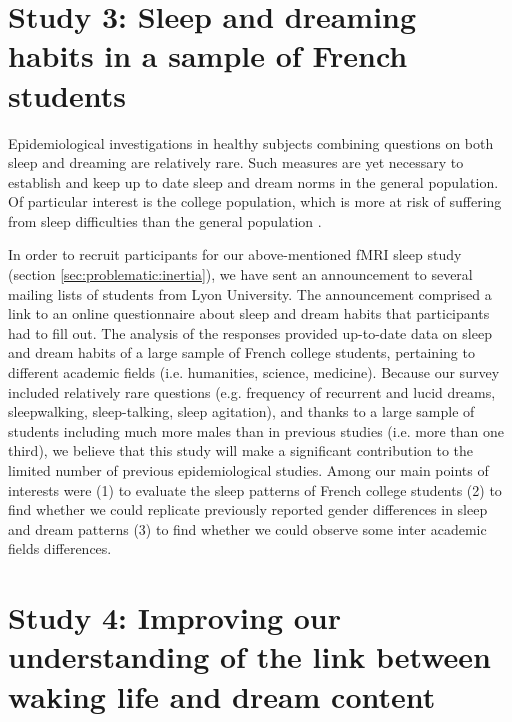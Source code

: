 \FloatBarrier

\section{Study 3: Sleep and dreaming habits in a sample of French students}
\label{sec:problematic:survey}

Epidemiological investigations in healthy subjects combining questions on both sleep and dreaming are relatively rare. Such measures are yet necessary to establish and keep up to date sleep and dream norms in the general population. Of particular interest is the college population, which is more at risk of suffering from sleep difficulties than the general population \citep{buboltz_sleep_2001, curcio_sleep_2006, forquer_sleep_2008, lund_sleep_2010}.

In order to recruit participants for our above-mentioned fMRI sleep study (section \ref{sec:problematic:inertia}), we have sent an announcement to several mailing lists of students from Lyon University. The announcement comprised a link to an online questionnaire about sleep and dream habits that participants had to fill out. The analysis of the responses provided up-to-date data on sleep and dream habits of a large sample of French college students, pertaining to different academic fields (i.e. humanities, science, medicine). Because our survey included relatively rare questions (e.g. frequency of recurrent and lucid dreams, sleepwalking, sleep-talking, sleep agitation), and thanks to a large sample of students including much more males than in previous studies (i.e. more than one third), we believe that this study will make a significant contribution to the limited number of previous epidemiological studies. Among our main points of interests were (1) to evaluate the sleep patterns of French college students (2) to find whether we could replicate previously reported gender differences in sleep and dream patterns (3) to find whether we could observe some inter academic fields differences.

\section{Study 4: Improving our understanding of the link between waking life and dream content}
\label{sec:problematic:wle}

